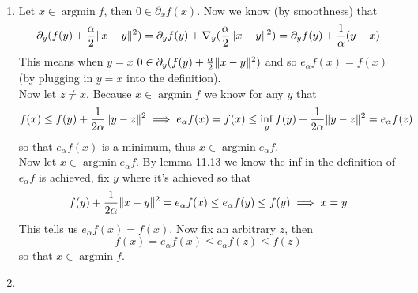 \documentclass{article}
\newenvironment{ex}[1]
  {\renewcommand\theexercise{#1}\exercise}
  {\endexercise}
\DeclareMathOperator*{\argmin}{arg min}
\begin{document}
\begin{ex}{11.14} %
  \, \\
  \begin{enumerate}[label=(\alph*)]
    \item
      Let $x \in \argmin f$, then $0 \in \partial_x f(x)$. Now we know (by smoothness) that
      $$
      \partial_y ( f(y) + \frac{\alpha}{2} \lVert x- y\rVert^2 ) = \partial_y f(y) + \nabla_y ( \frac{\alpha}{2} \lVert x-y\rVert^2 ) = \partial_y f(y) + \frac{1}{\alpha} (y-x)
      $$
      This means when $y = x$ $0 \in \partial_y ( f(y) + \frac{\alpha}{2} \lVert x- y\rVert^2 )$ and so $e_\alpha f(x) = f(x)$ (by plugging in $y = x$ into the definition). \, \\

      Now let $z \ne x$. Because $x \in \argmin f$ we know for any $y$ that
      $$
      f(x) \le f(y) + \frac{1}{2\alpha} \lVert y - z\rVert^2 \implies e_\alpha f(x) = f(x) \le \inf_y f(y) + \frac{1}{2\alpha} \lVert y - z\rVert^2 = e_\alpha f(z)
      $$
      so that $e_\alpha f(x)$ is a minimum, thus $x \in \argmin e_\alpha f$. \, \\

      Now let $x \in \argmin e_\alpha f$. By lemma 11.13 we know the inf in the definition of $e_\alpha f$ is achieved, fix $y$ where it's achieved so that
      $$
      f(y) + \frac{1}{2\alpha} \lVert x - y\rVert^2 = e_\alpha f(x) \le e_\alpha f(y) \le f(y) \implies x = y
      $$
      This tells us $e_\alpha f(x) = f(x)$. Now fix an arbitrary $z$, then
      $$
      f(x) = e_\alpha f(x) \le e_\alpha f(z) \le f(z)
      $$
      so that $x \in \argmin f$.
    \item
  \end{enumerate}
\end{ex} %
\end{document}
